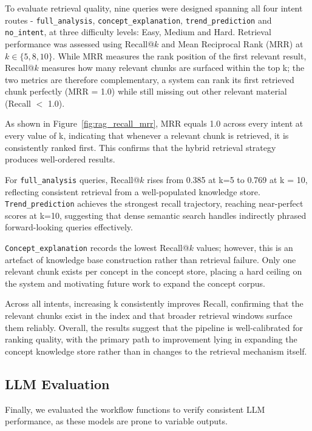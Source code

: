 To evaluate retrieval quality, nine queries were designed spanning all four intent routes -  \texttt{full\_analysis}, \texttt{concept\_explanation}, \texttt{trend\_prediction} and \texttt{no\_intent}, at three difficulty levels: Easy, Medium and Hard. Retrieval performance was assessed using Recall@$k$ and Mean Reciprocal Rank (MRR) at $k \in \{5, 8, 10\}$. While MRR measures the rank position of the first relevant result, Recall@$k$ measures how many relevant chunks are surfaced within the top k; the two metrics are therefore complementary, a system can rank its first retrieved chunk perfectly (MRR = 1.0) while still missing out other relevant material (Recall $<$ 1.0).

As shown in Figure~\ref{fig:rag_recall_mrr}, MRR equals 1.0 across every intent at every value of k, indicating that whenever a relevant chunk is retrieved, it is consistently ranked first. This confirms that the hybrid retrieval strategy produces well-ordered results.

For \texttt{full\_analysis} queries, Recall@$k$ rises from 0.385 at k=5 to 0.769 at k = 10, reflecting consistent retrieval from a well-populated knowledge store. \texttt{Trend\_prediction} achieves the strongest recall trajectory, reaching near-perfect scores at k=10, suggesting that dense semantic search handles indirectly phrased forward-looking queries effectively.

\texttt{Concept\_explanation} records the lowest Recall@$k$ values; however, this is an artefact of knowledge base construction rather than retrieval failure. Only one relevant chunk exists per concept in the concept store, placing a hard ceiling on the system and motivating future work to expand the concept corpus.

Across all intents, increasing k consistently improves Recall, confirming that the relevant chunks exist in the index and that broader retrieval windows surface them reliably. Overall, the results suggest that the pipeline is well-calibrated for ranking quality, with the primary path to improvement lying in expanding the concept knowledge store rather than in changes to the retrieval mechanism itself.



\subsection{LLM Evaluation}
Finally, we evaluated the workflow functions to verify consistent LLM performance, as these models are prone to variable outputs.


